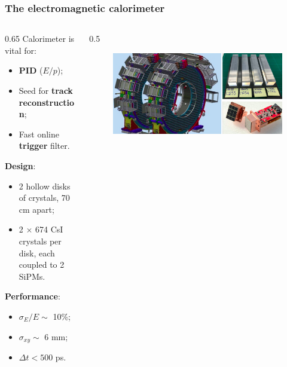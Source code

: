 \documentclass{beamer}
\begin{document}
\begin{frame}
    \frametitle{The electromagnetic calorimeter}
    \begin{columns}
            \begin{column}{0.65\framewidth}
      Calorimeter is vital for:
      \begin{itemize}
          \item \textbf{PID} ($E/p$);
          \item Seed for \textbf{track reconstruction};
          \item Fast online \textbf{trigger} filter.
      \end{itemize}
      \textbf{Design}:
      \begin{itemize}
        \item 2 hollow disks of crystals, 70 cm apart;
          \item 2 $\times$ 674 CsI crystals per disk, each coupled to 2 SiPMs.
      \end{itemize}
      \textbf{Performance}:
      \begin{itemize}
          \item $\sigma_E/E \sim$ 10\%;
          \item $\sigma_{xy}\sim$ 6 mm;
          \item $\Delta t < 500$ ps.
      \end{itemize}
               \end{column}
        \begin{column}{0.5\framewidth}
            \begin{figure}[h]
            \centering
            \includegraphics[width=\columnwidth ]{figures/png/Screenshot_20240322_121000.png}
        \end{figure}
              \begin{figure}[h]
            \centering

\end{figure}
\end{column}
\end{columns}
\end{frame}
\end{document}
